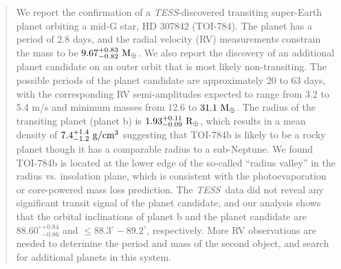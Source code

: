 \documentclass[twocolumn]{aastex631}
\newcommand{\tess}{\textit{TESS}\ }
\begin{document}
\begin{abstract}

We report the confirmation of a \textit{TESS}-discovered transiting super-Earth planet orbiting a mid-G star, HD 307842 (TOI-784). The planet has a period of 2.8 days, and the radial velocity (RV) measurements constrain the mass to be $9.67^{+0.83}_{-0.82}\ \rm{M_{\oplus}}$.
We also report the discovery of an additional planet candidate on an outer orbit that is most likely non-transiting. The possible periods of the planet candidate are approximately 20 to 63 days, with the corresponding RV semi-amplitudes expected to range from 3.2 to 5.4 m/s and minimum masses from $12.6$ to $31.1\ \rm{M_{\oplus}}$.
The radius of the transiting planet (planet b) is $1.93^{+0.11}_{-0.09}\ \rm{R_{\oplus}}$, which results in a mean density of $7.4^{+1.4}_{-1.2}\ \rm{g/cm^3}$ suggesting that TOI-784b is likely to be a rocky planet though it has a comparable radius to a sub-Neptune. We found TOI-784b is located at the lower edge of the so-called ``radius valley'' in the radius vs. insolation plane, which is consistent with the photoevaporation or core-powered mass loss prediction. 
The \tess data did not reveal any significant transit signal of the planet candidate, and our analysis shows that the orbital inclinations of planet b and the planet candidate are ${88.60^{\circ}}^{+0.84}_{-0.86}$ and $\leqslant 88.3^{\circ}-89.2^{\circ}$, respectively. More RV observations are needed to determine the period and mass of the second object, and search for additional planets in this system.

\end{abstract}

\end{document}

